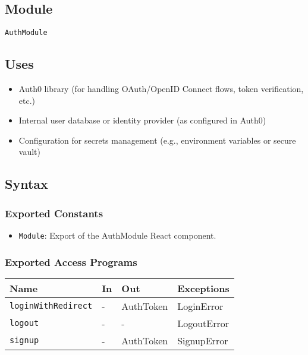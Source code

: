 \documentclass[12pt, titlepage]{article}
\begin{document}
\subsection{Module}

\texttt{AuthModule}

\subsection{Uses}

\begin{itemize}
    \item Auth0 library (for handling OAuth/OpenID Connect flows, token verification, etc.)
    \item Internal user database or identity provider (as configured in Auth0)
    \item Configuration for secrets management (e.g., environment variables or secure vault)
\end{itemize}

\subsection{Syntax}

\subsubsection{Exported Constants}

\begin{itemize}
    \item \texttt{Module}: Export of the AuthModule React component.
\end{itemize}

\subsubsection{Exported Access Programs}

\begin{center}
\begin{tabular}{p{5cm} p{3.5cm} p{3.5cm} p{2cm}}
\hline
\textbf{Name} & \textbf{In} & \textbf{Out} & \textbf{Exceptions} \\
\hline
\texttt{loginWithRedirect} & - & AuthToken & LoginError \\
\texttt{logout} & - & - & LogoutError \\
\texttt{signup} & - & AuthToken & SignupError \\
\hline
\end{tabular}
\end{center}
\end{document}
